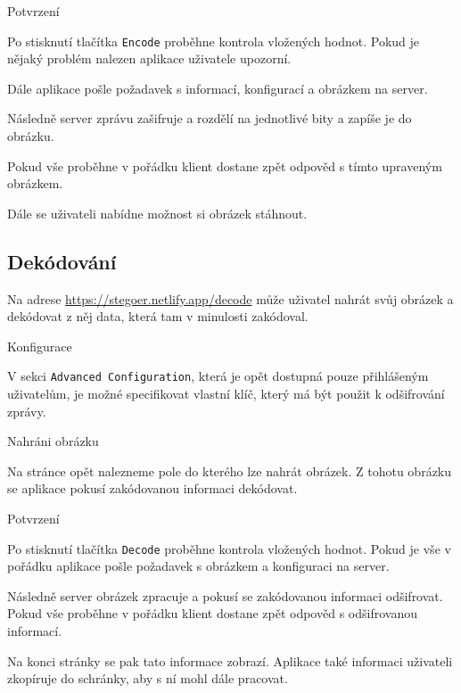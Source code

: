 \begin{subsubsection}{Potvrzení}\label{subsubsec:enc-potvrzeni}

Po stisknutí tlačítka \texttt{Encode} proběhne kontrola vložených hodnot.
Pokud je nějaký problém nalezen aplikace uživatele upozorní.

Dále aplikace pošle požadavek s informací, konfigurací a
obrázkem na server.

Následně server zprávu zašifruje a rozdělí na jednotlivé bity a zapíše je do
obrázku.

Pokud vše proběhne v pořádku klient dostane zpět odpověd s tímto upraveným
obrázkem.

Dále se uživateli nabídne možnost si obrázek stáhnout.

\end{subsubsection}

\subsection{Dekódování}\label{subsec:dekodovani-dat}
Na adrese \url{https://stegoer.netlify.app/decode} může uživatel nahrát svůj
obrázek a dekódovat z něj data, která tam v minulosti zakódoval.

\begin{subsubsection}{Konfigurace}\label{subsubsec:dec-konfigurace}

V sekci \texttt{Advanced Configuration}, která je opět dostupná pouze
přihlášeným uživatelům, je možné specifikovat vlastní klíč, který má být použit
k odšifrování zprávy.

\end{subsubsection}

\begin{subsubsection}{Nahráni obrázku}\label{subsubsec:dec-nahrani-obrazku}

Na stránce opět nalezneme pole do kterého lze nahrát obrázek.
Z tohotu obrázku se aplikace pokusí zakódovanou informaci dekódovat.

\end{subsubsection}

\begin{subsubsection}{Potvrzení}\label{subsubsec:dec-potvrzeni}

Po stisknutí tlačítka \texttt{Decode} proběhne kontrola vložených hodnot.
Pokud je vše v pořádku aplikace pošle požadavek s obrázkem a konfiguraci na
server.

Následně server obrázek zpracuje a pokusí se zakódovanou informaci odšifrovat.
Pokud vše proběhne v pořádku klient dostane zpět odpověd s odšifrovanou
informací.

Na konci stránky se pak tato informace zobrazí.
Aplikace také informaci uživateli zkopíruje do schránky, aby s ní mohl dále
pracovat.

\end{subsubsection}
